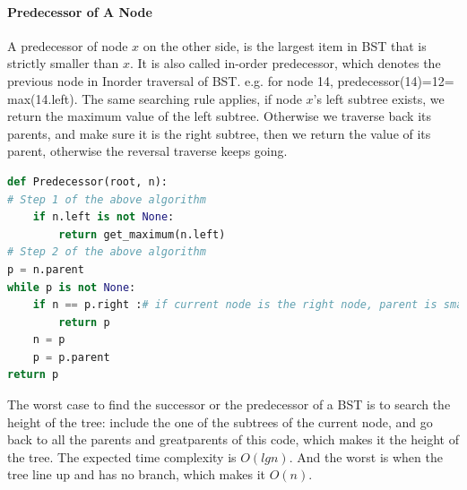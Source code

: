 \documentclass[../main.tex]{subfiles}
\begin{document}
\paragraph{Predecessor of A Node}  A predecessor of node $x$ on the other side, is the largest item in BST that is strictly smaller than $x$. It is also called in-order predecessor, which denotes the previous node in Inorder traversal of BST. e.g. for node 14, predecessor(14)=12= max(14.left). The same searching rule applies, if node $x$'s left subtree exists, we return the maximum value of the left subtree. Otherwise we traverse back its parents, and make sure it is the right subtree, then we return the value of its parent, otherwise the reversal traverse keeps going. 
\begin{lstlisting}[language = Python]
def Predecessor(root, n):
# Step 1 of the above algorithm
    if n.left is not None:
        return get_maximum(n.left)
# Step 2 of the above algorithm
p = n.parent
while p is not None:
    if n == p.right :# if current node is the right node, parent is smaller
        return p
    n = p
    p = p.parent
return p
\end{lstlisting}
 The worst case to find the successor or the predecessor of a BST is to search the height of the tree: include the one of the subtrees of the current node, and go back to all the parents and greatparents of this code, which makes it the height of the tree. The expected time complexity is $O(lgn)$. And the worst is when the tree line up and has no branch, which makes it $O(n)$. 
 
 



\end{document}
